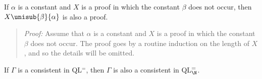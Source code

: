 \begin{Lthm} \label{lemma:prsub}
  If $\alpha$ is a constant and $X$ is a proof in which the constant $\beta$ does not occur, then $X\unisub{\beta}{\alpha}$ is also a proof.
\end{Lthm}

\begin{quote} 
  \textit{Proof:} Assume that $\alpha$ is a constant and $X$ is a proof in which the constant $\beta$ does not occur.
  The proof goes by a routine induction on the length of $X$, and so the details will be omitted.
%
\end{quote}



\begin{Lthm} \label{lemma:const}
  If $\Gamma$ is a consistent in QL$^=$, then $\Gamma$ is also a consistent in QL$^=_{\N}$.
\end{Lthm}

